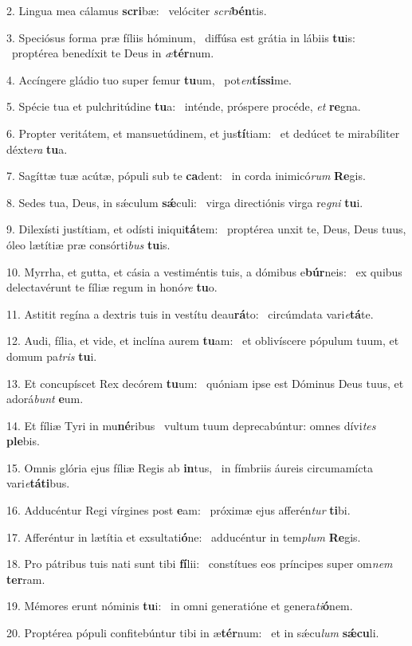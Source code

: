 2. Lingua mea cálamus \textbf{scri}bæ: \ast\  velóciter \textit{scri}\textbf{bén}tis.\

3. Speciósus forma præ fíliis hóminum, \dag\  diffúsa est grátia in lábiis \textbf{tu}is: \ast\  proptérea benedíxit te Deus in \textit{æ}\textbf{tér}num.\

4. Accíngere gládio tuo super femur \textbf{tu}um, \ast\  pot\textit{en}\textbf{tís}\textbf{si}me.\

5. Spécie tua et pulchritúdine \textbf{tu}a: \ast\  inténde, próspere procéde, \textit{et} \textbf{re}gna.\

6. Propter veritátem, et mansuetúdinem, et jus\textbf{tí}tiam: \ast\  et dedúcet te mirabíliter déxte\textit{ra} \textbf{tu}a.\

7. Sagíttæ tuæ acútæ, pópuli sub te \textbf{ca}dent: \ast\  in corda inimicó\textit{rum} \textbf{Re}gis.\

8. Sedes tua, Deus, in sǽculum \textbf{sǽ}culi: \ast\  virga directiónis virga re\textit{gni} \textbf{tu}i.\

9. Dilexísti justítiam, et odísti iniqui\textbf{tá}tem: \ast\  proptérea unxit te, Deus, Deus tuus, óleo lætítiæ præ consórti\textit{bus} \textbf{tu}is.\

10. Myrrha, et gutta, et cásia a vestiméntis tuis, a dómibus e\textbf{búr}neis: \ast\  ex quibus delectavérunt te fíliæ regum in honó\textit{re} \textbf{tu}o.\

11. Astitit regína a dextris tuis in vestítu deau\textbf{rá}to: \ast\  circúmdata vari\textit{e}\textbf{tá}te.\

12. Audi, fília, et vide, et inclína aurem \textbf{tu}am: \ast\  et oblivíscere pópulum tuum, et domum pa\textit{tris} \textbf{tu}i.\

13. Et concupíscet Rex decórem \textbf{tu}um: \ast\  quóniam ipse est Dóminus Deus tuus, et adorá\textit{bunt} \textbf{e}um.\

14. Et fíliæ Tyri in mu\textbf{né}ribus \ast\  vultum tuum deprecabúntur: omnes dívi\textit{tes} \textbf{ple}bis.\

15. Omnis glória ejus fíliæ Regis ab \textbf{in}tus, \ast\  in fímbriis áureis circumamícta vari\textit{e}\textbf{tá}\textbf{ti}bus.\

16. Adducéntur Regi vírgines post \textbf{e}am: \ast\  próximæ ejus afferén\textit{tur} \textbf{ti}bi.\

17. Afferéntur in lætítia et exsultati\textbf{ó}ne: \ast\  adducéntur in tem\textit{plum} \textbf{Re}gis.\

18. Pro pátribus tuis nati sunt tibi \textbf{fí}lii: \ast\  constítues eos príncipes super om\textit{nem} \textbf{ter}ram.\

19. Mémores erunt nóminis \textbf{tu}i: \ast\  in omni generatióne et genera\textit{ti}\textbf{ó}nem.\

20. Proptérea pópuli confitebúntur tibi in æ\textbf{tér}num: \ast\  et in sǽcu\textit{lum} \textbf{sǽ}\textbf{cu}li.\

